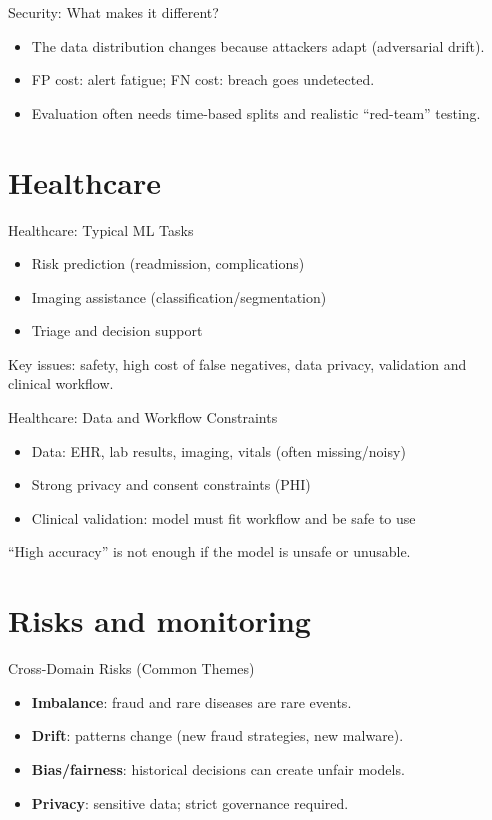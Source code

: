 \documentclass[aspectratio=169]{beamer}
\begin{document}
\begin{frame}{Security: What makes it different?}
  \begin{itemize}[<+->]
    \item The data distribution changes because attackers adapt (adversarial drift).
    \item FP cost: alert fatigue; FN cost: breach goes undetected.
    \item Evaluation often needs time-based splits and realistic ``red-team'' testing.
  \end{itemize}
\end{frame}

\section{Healthcare}
\label{sec:health}

\begin{frame}{Healthcare: Typical ML Tasks}
  \begin{itemize}[<+->]
    \item Risk prediction (readmission, complications)
    \item Imaging assistance (classification/segmentation)
    \item Triage and decision support
  \end{itemize}
  \vspace{0.4em}
  Key issues: safety, high cost of false negatives, data privacy, validation and clinical workflow.
\end{frame}

\begin{frame}{Healthcare: Data and Workflow Constraints}
  \begin{itemize}[<+->]
    \item Data: EHR, lab results, imaging, vitals (often missing/noisy)
    \item Strong privacy and consent constraints (PHI)
    \item Clinical validation: model must fit workflow and be safe to use
  \end{itemize}
  \small ``High accuracy'' is not enough if the model is unsafe or unusable.
\end{frame}

\section{Risks and monitoring}
\label{sec:risks}

\begin{frame}{Cross-Domain Risks (Common Themes)}
  \begin{itemize}[<+->]
    \item \textbf{Imbalance}: fraud and rare diseases are rare events.
    \item \textbf{Drift}: patterns change (new fraud strategies, new malware).
    \item \textbf{Bias/fairness}: historical decisions can create unfair models.
    \item \textbf{Privacy}: sensitive data; strict governance required.
  \end{itemize}
\end{frame}
\end{document}
